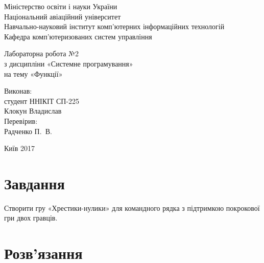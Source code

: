 \documentclass[a4paper,oneside,DIV=12,12pt]{scrartcl}
\begin{document}
	\begin{titlepage}
    \begin{center}
	Міністерство освіти і науки України\\
	Національний авіаційний університет\\
	Навчально-науковий інститут комп'ютерних інформаційних технологій\\
	Кафедра комп'ютеризованих систем управління

	\vspace{\fill}

	Лабораторна робота №2\\
	з дисципліни «Системне програмування»\\
	на тему «Функції»

	\vspace{\fill}
	
	\begin{flushright}
				Виконав:\\
				студент ННІКІТ СП-225\\
				Клокун Владислав\\
				Перевірив:\\
				Радченко П.~В.
	\end{flushright}

	Київ 2017

    \end{center}
    \end{titlepage}
	
	\section{Завдання}
		Створити гру «Хрестики-нулики» для командного рядка з підтримкою покрокової гри двох гравців.
		
	\section{Розв'язання}
		
\end{document}
